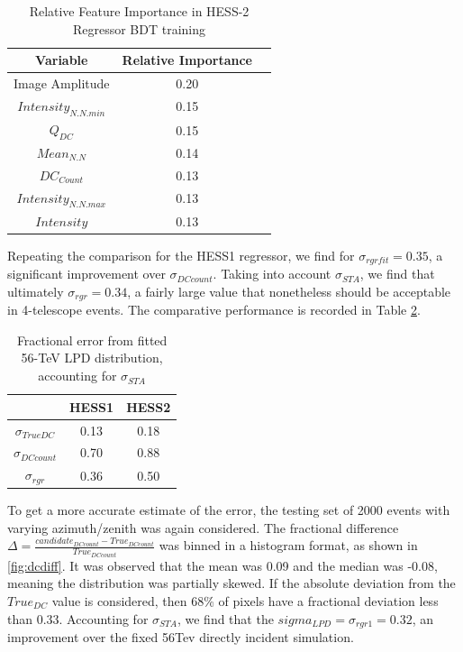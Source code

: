 \documentclass{article}
\begin{document}
\begin{table}[h!]
  \centering
  \caption{Relative Feature Importance in HESS-2 Regressor BDT training}
  \label{tab:hess2regressor}
  \begin{tabular}{ccc}
    \toprule
    Variable & Relative Importance\\
    \midrule
    Image Amplitude & 0.20\\
    $Intensity_{N.N.min}$ & 0.15\\
    $Q_{DC}$ & 0.15\\
    $Mean_{N.N}$ & 0.14\\
    $DC_{Count}$ & 0.13\\
    $Intensity_{N.N.max}$ & 0.13\\
    $Intensity$ & 0.13\\
    \bottomrule
  \end{tabular}
\end{table} 

Repeating the comparison for the HESS1 regressor, we find for $\sigma_{rgrfit} = 0.35$, a significant improvement over $\sigma_{DCcount}$. Taking into account $\sigma_{STA}$, we find that ultimately $\sigma_{rgr}=0.34$, a fairly large value that nonetheless should be acceptable in 4-telescope events. The comparative performance is recorded in Table \ref{tab:lpderror}.

\begin{table}[h!]
  \centering
  \caption{Fractional error from fitted 56-TeV LPD distribution, accounting for $\sigma_{STA}$}
  \label{tab:lpderror}
  \begin{tabular}{ccc}
    \toprule
    & HESS1 & HESS2\\
    \midrule
    $\sigma_{TrueDC}$ & 0.13 & 0.18\\
    $\sigma_{DCcount}$ & 0.70 & 0.88\\
    $\sigma_{rgr}$ & 0.36 & 0.50\\ 
    \bottomrule
  \end{tabular}
\end{table} 

To get a more accurate estimate of the error, the testing set of 2000 events with varying azimuth/zenith was again considered. The fractional difference $\Delta = \frac{ candidate_{DC count} - True_{DC count}}{True_{DC count}}$ was binned in a histogram format, as shown in \ref{fig:dcdiff}. It was observed that the mean was 0.09 and the median was -0.08, meaning the distribution was partially skewed. If the absolute deviation from the $True_{DC}$ value is considered, then 68\% of pixels have a fractional deviation less than 0.33. Accounting for $\sigma_{STA}$, we find that the $sigma_{LPD}=\sigma_{rgr1}=0.32$, an improvement over the fixed 56Tev directly incident simulation.
\end{document}

